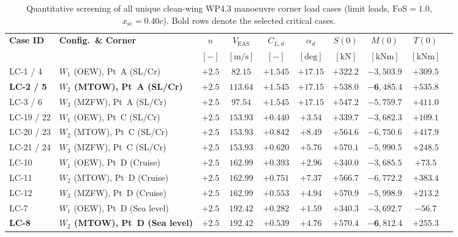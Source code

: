 \begin{table}[htbp]
    \centering
    \caption{Quantitative screening of all unique clean-wing WP4.3 manoeuvre corner load cases (limit loads, $\mathrm{FoS} = 1.0$, $x_{\mathrm{sc}} = 0.40c$). Bold rows denote the selected critical cases.}
    \label{tab:wp41_screening}
    \begin{tabular}{@{}llcccccccc@{}}
        \toprule
        \textbf{Case ID} & \textbf{Config.\ \& Corner} & $n$ & $V_{\mathrm{EAS}}$ & $C_{L,d}$ & $\alpha_d$ & $S(0)$ & $M(0)$ & $T(0)$ \\
         & & $[-]$ & $[\text{m/s}]$ & $[-]$ & $[\text{deg}]$ & $[\text{kN}]$ & $[\text{kNm}]$ & $[\text{kNm}]$ \\
        \midrule
        LC-1 / 4  & $W_1$ (OEW), Pt~A (SL/Cr)     & $+2.5$ & $82.15$  & $+1.545$ & $+17.15$ & $+322.2$ & $-3{,}503.9$ & $+309.5$ \\
        \textbf{LC-2 / 5}  & \textbf{$W_2$ (MTOW), Pt~A (SL/Cr)}    & $\mathbf{+2.5}$ & $\mathbf{113.64}$ & $\mathbf{+1.545}$ & $\mathbf{+17.15}$ & $\mathbf{+538.0}$ & $\mathbf{-6{,}485.4}$ & $\mathbf{+535.8}$ \\
        LC-3 / 6  & $W_3$ (MZFW), Pt~A (SL/Cr)    & $+2.5$ & $97.54$  & $+1.545$ & $+17.15$ & $+547.2$ & $-5{,}759.7$ & $+411.0$ \\
        LC-19 / 22 & $W_1$ (OEW), Pt~C (SL/Cr)    & $+2.5$ & $153.93$ & $+0.440$ & $+3.54$  & $+339.7$ & $-3{,}682.3$ & $+109.1$ \\
        LC-20 / 23 & $W_2$ (MTOW), Pt~C (SL/Cr)   & $+2.5$ & $153.93$ & $+0.842$ & $+8.49$  & $+564.6$ & $-6{,}750.6$ & $+417.9$ \\
        LC-21 / 24 & $W_3$ (MZFW), Pt~C (SL/Cr)   & $+2.5$ & $153.93$ & $+0.620$ & $+5.76$  & $+570.1$ & $-5{,}990.5$ & $+248.5$ \\
        LC-10     & $W_1$ (OEW), Pt~D (Cruise)    & $+2.5$ & $162.99$ & $+0.393$ & $+2.96$  & $+340.0$ & $-3{,}685.5$ & $+73.5$  \\
        LC-11     & $W_2$ (MTOW), Pt~D (Cruise)   & $+2.5$ & $162.99$ & $+0.751$ & $+7.37$  & $+566.7$ & $-6{,}772.2$ & $+383.4$ \\
        LC-12     & $W_3$ (MZFW), Pt~D (Cruise)   & $+2.5$ & $162.99$ & $+0.553$ & $+4.94$  & $+570.9$ & $-5{,}998.9$ & $+213.2$ \\
        LC-7      & $W_1$ (OEW), Pt~D (Sea level) & $+2.5$ & $192.42$ & $+0.282$ & $+1.59$  & $+340.3$ & $-3{,}692.7$ & $-56.7$  \\
        \textbf{LC-8}      & \textbf{$W_2$ (MTOW), Pt~D (Sea level)} & $\mathbf{+2.5}$ & $\mathbf{192.42}$ & $\mathbf{+0.539}$ & $\mathbf{+4.76}$  & $\mathbf{+570.4}$ & $\mathbf{-6{,}812.4}$ & $\mathbf{+255.3}$ \\

\end{tabular}
\end{table}
